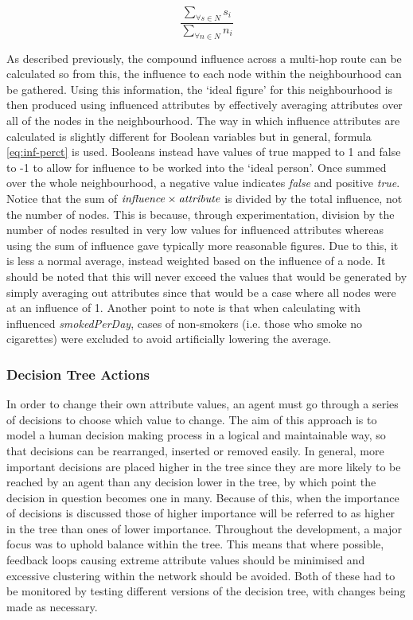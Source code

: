 \documentclass[]{report}
\begin{document}
\begin{equation}
\frac{\sum_{\forall s \in N} s_{i}}{\sum_{\forall n \in N} n_{i}}
\label{eq:inf-perct}
\end{equation}

As described previously, the compound influence across a multi-hop route can be calculated so from this, the influence to each node within the neighbourhood can be gathered. Using this information, the `ideal figure' for this neighbourhood is then produced using influenced attributes by effectively averaging attributes over all of the nodes in the neighbourhood. The way in which influence attributes are calculated is slightly different for Boolean variables but in general, formula \ref{eq:inf-perct} is used. Booleans instead have values of true mapped to 1 and false to -1 to allow for influence to be worked into the `ideal person'. Once summed over the whole neighbourhood, a negative value indicates \emph{false} and positive \emph{true}. Notice that the sum of $\text{\emph{influence}} \times \text{\emph{attribute}}$ is divided by the total influence, not the number of nodes. This is because, through experimentation, division by the number of nodes resulted in very low values for influenced attributes whereas using the sum of influence gave typically more reasonable figures. Due to this, it is less a normal average, instead weighted based on the influence of a node. It should be noted that this will never exceed the values that would be generated by simply averaging out attributes since that would be a case where all nodes were at an influence of 1. Another point to note is that when calculating with influenced \emph{smokedPerDay}, cases of non-smokers (i.e. those who smoke no cigarettes) were excluded to avoid artificially lowering the average.

\label{sec:neighbourhood}

\subsubsection{Decision Tree Actions}
\label{sec:dectree}
In order to change their own attribute values, an agent must go through a series of decisions to choose which value to change. The aim of this approach is to model a human decision making process in a logical and maintainable way, so that decisions can be rearranged, inserted or removed easily. In general, more important decisions are placed higher in the tree since they are more likely to be reached by an agent than any decision lower in the tree, by which point the decision in question becomes one in many. Because of this, when the importance of decisions is discussed those of higher importance will be referred to as higher in the tree than ones of lower importance. Throughout the development, a major focus was to uphold balance within the tree. This means that where possible, feedback loops causing extreme attribute values should be minimised and excessive clustering within the network should be avoided. Both of these had to be monitored by testing different versions of the decision tree, with changes being made as necessary.
\end{document}
